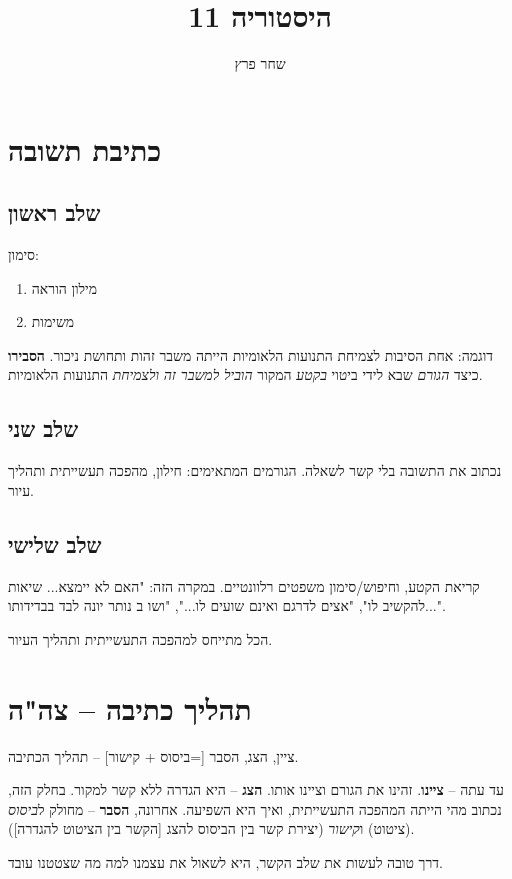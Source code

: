 \documentclass[]{article}
\author{שחר פרץ}
\title{היסטוריה 11}
\begin{document}
	\maketitle
	\section{כתיבת תשובה}
	\subsection{שלב ראשון}
	
	סימון: 
	\begin{enumerate}
		\item מילון הוראה
		\item משימות
	\end{enumerate}
	
	דוגמה: 
	אחת הסיבות לצמיחת התנועות הלאומיות הייתה משבר זהות ותחושת ניכור. \textbf{הסבירו} כיצד \textit{הגורם} שבא לידי ביטוי \textit{בקטע} המקור \textit{הוביל} \textit{למשבר זה }\textit{ולצמיחת} התנועות הלאומיות. 
	
	\subsection{שלב שני}
	
	נכתוב את התשובה בלי קשר לשאלה. הגורמים המתאימים: חילון, מהפכה תעשייתית ותהליך עיור. 
	
	\subsection{שלב שלישי}
	קריאת הקטע, וחיפוש/סימון משפטים רלוונטיים. במקרה הזה: 
	"האם לא יימצא... שיאות להקשיב לו", "אצים לדרגם ואינם שועים לו...", "ושו ב נותר יונה לבד בבדידותו...". 
	
	הכל מתייחס למהפכה התעשייתית ותהליך העיור. 
	\section{תהליך כתיבה – צה"ה}
	ציין, הצג, הסבר [=ביסוס + קישור] – תהליך הכתיבה. 
	
	עד עתה – \textbf{ציינו}. זהינו את הגורם וציינו אותו. \textbf{הצג} – היא הגדרה ללא קשר למקור. בחלק הזה, נכתוב מהי הייתה המהפכה התעשייתית, ואיך היא השפיעה. אחרונה, \textbf{הסבר} – מחולק ל\textit{ביסוס} (ציטוט) ו\textit{קישור} (יצירת קשר בין הביסוס להצג [הקשר בין הציטוט להגדרה]). 
	
	דרך טובה לעשות את שלב הקשר, היא לשאול את עצמנו למה מה שצטטנו עובד. 
	
\end{document}
